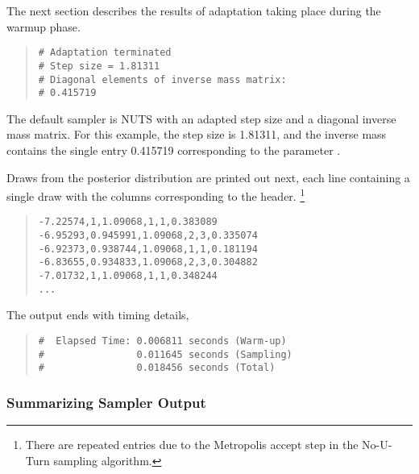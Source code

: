The next section describes the results of adaptation taking place during
the warmup phase.
%
\begin{quote}
\begin{Verbatim}[fontsize=\small]
# Adaptation terminated
# Step size = 1.81311
# Diagonal elements of inverse mass matrix:
# 0.415719
\end{Verbatim}
\end{quote}
%
The default sampler is NUTS with an adapted step size and a diagonal
inverse mass matrix.  For this example, the step size is 1.81311, and
the inverse mass contains the single entry 0.415719 corresponding to
the parameter .

Draws from the posterior distribution are printed out next, each line
containing a single draw with the columns corresponding to the
header.
%
\footnote{There are repeated entries due to the Metropolis accept step
in the No-U-Turn sampling algorithm.}
%
%
\begin{quote}
\begin{Verbatim}[fontsize=\small]
-7.22574,1,1.09068,1,1,0.383089
-6.95293,0.945991,1.09068,2,3,0.335074
-6.92373,0.938744,1.09068,1,1,0.181194
-6.83655,0.934833,1.09068,2,3,0.304882
-7.01732,1,1.09068,1,1,0.348244
...
\end{Verbatim}
\end{quote}
%

The output ends with timing details,%
\begin{quote}
\begin{Verbatim}[fontsize=\small]
#  Elapsed Time: 0.006811 seconds (Warm-up)
#                0.011645 seconds (Sampling)
#                0.018456 seconds (Total)
\end{Verbatim}
\end{quote}


\subsubsection{Summarizing Sampler Output}

